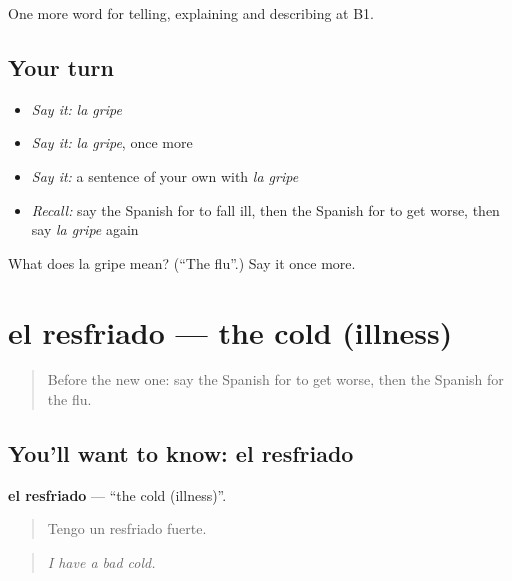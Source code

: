 \begin{grammarlens}[title={What you've built}]
One more word for telling, explaining and describing at B1.
\end{grammarlens}

\subsection*{Your turn}
\begin{itemize}
\raggedright
  \item \emph{Say it:} \emph{la gripe}
  \item \emph{Say it:} \emph{la gripe}, once more
  \item \emph{Say it:} a sentence of your own with \emph{la gripe}
  \item \emph{Recall:} say the Spanish for to fall ill, then the Spanish for to get worse, then say \emph{la gripe} again
\end{itemize}

\begin{tcolorbox}[breakable,colback=teal!4,colframe=teal!35!black,title={Before you move on}]
What does la gripe mean? (\textquotedblleft{}The flu\textquotedblright{}.) Say it once more.
\end{tcolorbox}
\section[el resfriado]{el resfriado — the cold (illness)}

\label{lesson:ES-C733-resfriado}



\begin{quote}
Before the new one: say the Spanish for to get worse, then the Spanish for the flu.
\end{quote}

\subsection*{You'll want to know: el resfriado}
\textbf{el resfriado} — \textquotedblleft{}the cold (illness)\textquotedblright{}.

\begin{quote}
Tengo un resfriado fuerte.
\end{quote}

\begin{quote}
\emph{I have a bad cold.}
\end{quote}

